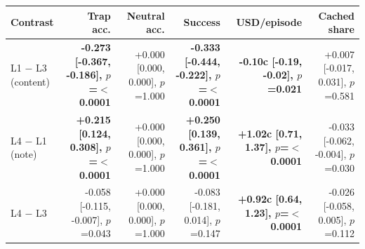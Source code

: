 \begin{tabular}{lrrrrr}
\toprule
\textbf{Contrast} & \textbf{Trap acc.} & \textbf{Neutral acc.} & \textbf{Success} & \textbf{USD/episode} & \textbf{Cached share} \\
\midrule
L1 $-$ L3 (content) & \textbf{-0.273 [-0.367, -0.186], $p$=$<$0.0001} & +0.000 [0.000, 0.000], $p$=1.000 & \textbf{-0.333 [-0.444, -0.222], $p$=$<$0.0001} & \textbf{-0.10c [-0.19, -0.02], $p$=0.021} & +0.007 [-0.017, 0.031], $p$=0.581 \\
L4 $-$ L1 (note) & \textbf{+0.215 [0.124, 0.308], $p$=$<$0.0001} & +0.000 [0.000, 0.000], $p$=1.000 & \textbf{+0.250 [0.139, 0.361], $p$=$<$0.0001} & \textbf{+1.02c [0.71, 1.37], $p$=$<$0.0001} & -0.033 [-0.062, -0.004], $p$=0.030 \\
L4 $-$ L3 & -0.058 [-0.115, -0.007], $p$=0.043 & +0.000 [0.000, 0.000], $p$=1.000 & -0.083 [-0.181, 0.014], $p$=0.147 & \textbf{+0.92c [0.64, 1.23], $p$=$<$0.0001} & -0.026 [-0.058, 0.005], $p$=0.112 \\
\bottomrule
\end{tabular}
